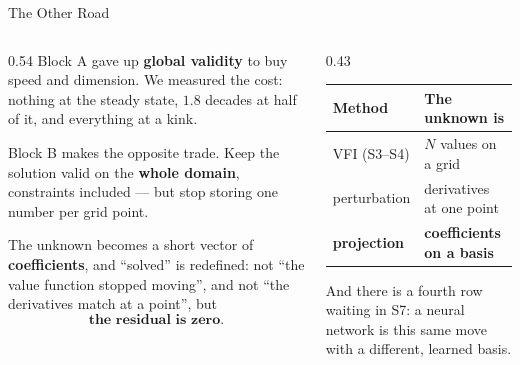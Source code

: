 \begin{frame}{The Other Road}
\begin{columns}[T]
\begin{column}{0.54\textwidth}
\small
Block A gave up \textbf{global validity} to buy speed and dimension. We measured the cost: nothing at the steady state, $1.8$ decades at half of it, and everything at a kink.
\medskip

Block B makes the opposite trade. Keep the solution valid on the \textbf{whole domain}, constraints included --- but stop storing one number per grid point.
\medskip

The unknown becomes a short vector of \textbf{coefficients}, and ``solved'' is redefined: not ``the value function stopped moving'', and not ``the derivatives match at a point'', but
\[
  \textbf{the residual is zero.}
\]
\end{column}
\begin{column}{0.43\textwidth}
\begin{center}\footnotesize
\begin{tabularx}{\linewidth}{@{}>{\raggedright\arraybackslash}p{1.55cm} >{\raggedright\arraybackslash}X@{}}
\toprule
\textbf{Method} & \textbf{The unknown is} \\
\midrule
VFI (S3--S4) & $N$ values on a grid \\
perturbation & derivatives at one point \\
\textbf{projection} & \textbf{coefficients on a basis} \\
\bottomrule
\end{tabularx}
\end{center}
\medskip
\begin{examplebox}\footnotesize
And there is a fourth row waiting in S7: a neural network is this same move with a different, learned basis.
\end{examplebox}
\end{column}
\end{columns}
\end{frame}


